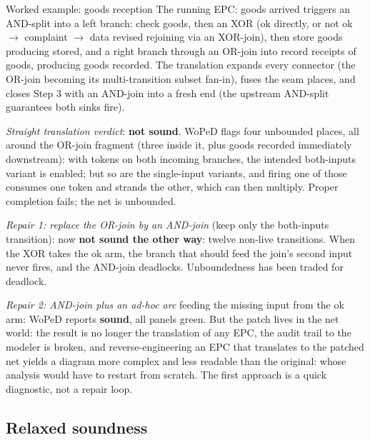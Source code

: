 \begin{examplebox}{Worked example: goods reception}
The running EPC: \textsf{goods arrived} triggers an AND-split into a left branch: \textsf{check goods}, then an XOR (\textsf{ok} directly, or \textsf{not ok} $\to$ \textsf{complaint} $\to$ \textsf{data revised} rejoining via an XOR-join), then \textsf{store goods} producing \textsf{stored}, and a right branch through an OR-join into \textsf{record receipts of goods}, producing \textsf{goods recorded}. The translation expands every connector (the OR-join becoming its multi-transition subset fan-in), fuses the seam places, and closes Step 3 with an AND-join into a fresh \textsf{end} (the upstream AND-split guarantees both sinks fire).
\par\smallskip
\emph{Straight translation verdict}: \textbf{not sound}. WoPeD flags four unbounded places, all around the OR-join fragment (three inside it, plus \textsf{goods recorded} immediately downstream): with tokens on both incoming branches, the intended both-inputs variant is enabled; but so are the single-input variants, and firing one of those consumes one token and strands the other, which can then multiply. Proper completion fails; the net is unbounded.
\par\smallskip
\emph{Repair 1: replace the OR-join by an AND-join} (keep only the both-inputs transition): now \textbf{not sound the other way}: twelve non-live transitions. When the XOR takes the \textsf{ok} arm, the branch that should feed the join's second input never fires, and the AND-join deadlocks. Unboundedness has been traded for deadlock.
\par\smallskip
\emph{Repair 2: AND-join plus an ad-hoc arc} feeding the missing input from the \textsf{ok} arm: WoPeD reports \textbf{sound}, all panels green. But the patch lives in the net world: the result is no longer the translation of any EPC, the audit trail to the modeler is broken, and reverse-engineering an EPC that translates to the patched net yields a diagram more complex and less readable than the original: whose analysis would have to restart from scratch. The first approach is a quick diagnostic, not a repair loop.
\end{examplebox}

\subsection{Relaxed soundness}

